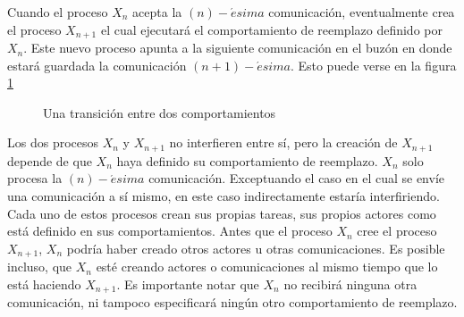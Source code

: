 Cuando el proceso $X_n$ acepta la $(n)-\acute{e}sima$ comunicación, eventualmente crea el proceso $X_{n+1}$ el cual ejecutará el comportamiento de reemplazo definido por $X_n$. Este nuevo proceso apunta a la siguiente comunicación en el buzón en donde estará guardada la comunicación $(n+1)-\acute{e}sima$. Esto puede verse en la figura \ref{fig:actortransition}

\begin{figure}[H]
\caption{Una transición entre dos comportamientos}
\label{fig:actortransition}
\end{figure}
Los dos procesos $X_n$ y $X_{n+1}$ no interfieren entre sí, pero la creación de $X_{n+1}$ depende de que $X_{n}$ haya definido su comportamiento de reemplazo. $X_n$ solo procesa la $(n)-\acute{e}sima$ comunicación. Exceptuando el caso en el cual se envíe una comunicación a sí mismo, en este caso indirectamente estaría interfiriendo. Cada uno de estos procesos crean sus propias tareas, sus propios actores como está definido en sus comportamientos. Antes que el proceso $X_n$ cree el proceso $X_{n+1}$, $X_n$ podría haber creado otros actores u otras comunicaciones. Es posible incluso, que $X_n$ esté creando actores o comunicaciones al mismo tiempo que lo está haciendo $X_{n+1}$. Es importante notar que $X_n$ no recibirá ninguna otra comunicación, ni tampoco especificará ningún otro comportamiento de reemplazo.


